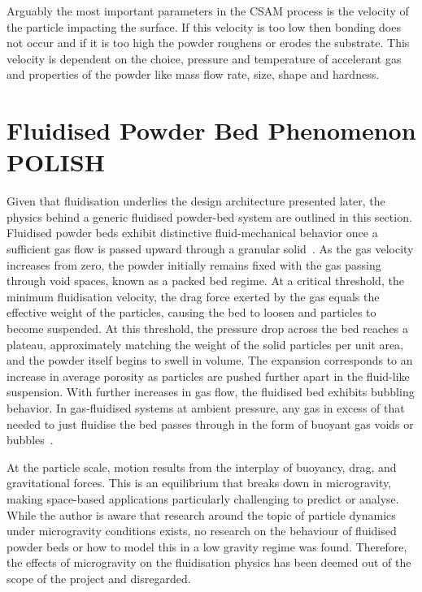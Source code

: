 Arguably the most important parameters in the CSAM process is the velocity of the particle impacting the surface. If this velocity is too low then bonding does not occur and if it is too high the powder roughens or erodes the substrate. This velocity is dependent on the choice, pressure and temperature of accelerant gas and properties of the powder like mass flow rate, size, shape and hardness. 
\newpage
\section{Fluidised Powder Bed Phenomenon POLISH}
Given that fluidisation underlies the design architecture presented later, the physics behind a generic fluidised powder-bed system are outlined in this section.
Fluidised powder beds exhibit distinctive fluid-mechanical behavior once a sufficient gas flow is passed upward through a granular solid~\cite{KuniiLevenspiel1977}. As the gas velocity increases from zero, the powder initially remains fixed with the gas passing through void spaces, known as a packed bed regime. At a critical threshold, the minimum fluidisation velocity, the drag force exerted by the gas equals the effective weight of the particles, causing the bed to loosen and particles to become suspended. At this threshold, the pressure drop across the bed reaches a plateau, approximately matching the weight of the solid particles per unit area, and the powder itself begins to swell in volume. The expansion corresponds to an increase in average porosity as particles are pushed further apart in the fluid-like suspension. With further increases in gas flow, the fluidised bed exhibits bubbling behavior. In gas-fluidised systems at ambient pressure, any gas in excess of that needed to just fluidise the bed passes through in the form of buoyant gas voids or bubbles~\cite{SHENG2022137168}.

At the particle scale, motion results from the interplay of buoyancy, drag, and gravitational forces. This is an equilibrium that breaks down in microgravity, making space-based applications particularly challenging to predict or analyse. While the author is aware that research around the topic of particle dynamics under microgravity conditions exists, no research on the behaviour of fluidised powder beds or how to model this in a low gravity regime was found. Therefore, the effects of microgravity on the fluidisation physics has been deemed out of the scope of the project and disregarded.

